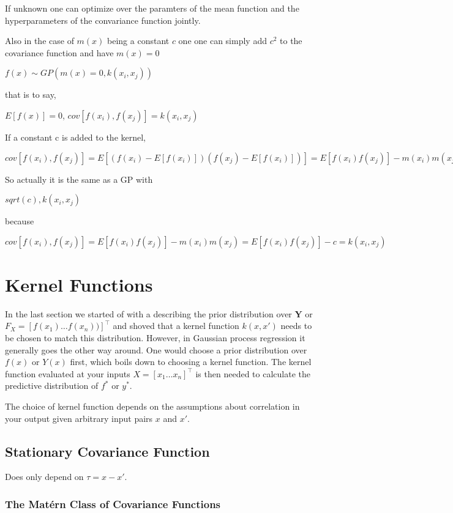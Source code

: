 If unknown one can optimize over the paramters of the mean function and the hyperparameters
of the convariance function jointly.

Also in the case of $m(x)$ being a constant $c$ one one can simply add $c^2$ to the covariance function
and have $m(x) =0$

$f(x) \sim GP(m(x)=0, k(x_i, x_j))$

that is to say,

$E[f(x)] = 0$, $cov[f(x_i), f(x_j)] = k(x_i, x_j)$

If a constant c is added to the kernel,

    $cov[f(x_i), f(x_j)] = E[(f(x_i) - E[f(x_i)])(f(x_j) -E[f(x_i)])]= E[f(x_i)f(x_j)] - m(x_i)m(x_j) = E[f(x_i)f(x_j)] = k(x_i, x_j) + c$

So actually it is the same as a GP with

    $sqrt(c), k(x_i, x_j)$

because

    $cov[f(x_i), f(x_j)] = E[f(x_i)f(x_j)] - m(x_i)m(x_j) = E[f(x_i)f(x_j)] - c = k(x_i, x_j)$





\section{Kernel Functions}\label{subsec:kernel}

In the last section we started of with a describing the prior distribution over
$\mathbf{Y}$ or $F_X = [f(x_1) \dots f(x_n))]^{\top}$ and shoved that a kernel function $k(x, x')$ needs to be
chosen to match this distribution.
However, in Gaussian process regression it generally goes the other way around.
One would choose a prior distribution over $f(x)$ or $Y(x)$ first, which boils down to choosing a kernel function.
The kernel function evaluated at your inputs $X=[x_1 \dots x_n]^{\top}$ is then needed to calculate the
predictive distribution of $f^{\ast}$ or $y^{\ast}$.

The choice of kernel function depends on the assumptions about correlation in your output given arbitrary input pairs
$x$ and $x'$.


\subsection{Stationary Covariance Function}
Does only depend on $\tau = x - x'$.

\subsubsection{The Matérn Class of Covariance Functions}

